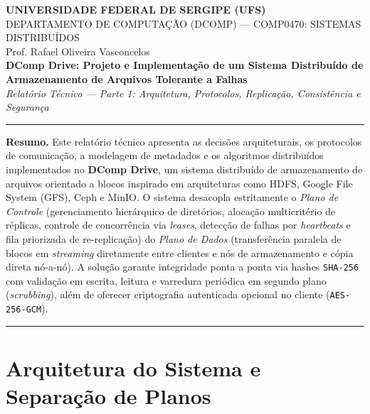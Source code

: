 \documentclass[10pt,a4paper]{article}
\begin{document}
\begin{center}
    {\large\bfseries UNIVERSIDADE FEDERAL DE SERGIPE (UFS)}\\
    {\normalsize DEPARTAMENTO DE COMPUTAÇÃO (DCOMP) — COMP0470: SISTEMAS DISTRIBUÍDOS}\\
    {\small Prof. Rafael Oliveira Vasconcelos}\\[8pt]
    {\LARGE\bfseries\color{ufsblue} DComp Drive: Projeto e Implementação de um Sistema Distribuído de Armazenamento de Arquivos Tolerante a Falhas}\\[4pt]
    {\normalsize\itshape Relatório Técnico — Parte 1: Arquitetura, Protocolos, Replicação, Consistência e Segurança}
\end{center}
\vspace{-4pt}
\noindent\rule{\textwidth}{0.8pt}
\vspace{2pt}

\textbf{Resumo.} Este relatório técnico apresenta as decisões arquiteturais, os protocolos de comunicação, a modelagem de metadados e os algoritmos distribuídos implementados no \textbf{DComp Drive}, um sistema distribuído de armazenamento de arquivos orientado a blocos inspirado em arquiteturas como HDFS, Google File System (GFS), Ceph e MinIO. O sistema desacopla estritamente o \textit{Plano de Controle} (gerenciamento hierárquico de diretórios, alocação multicritério de réplicas, controle de concorrência via \textit{leases}, detecção de falhas por \textit{heartbeats} e fila priorizada de re-replicação) do \textit{Plano de Dados} (transferência paralela de blocos em \textit{streaming} diretamente entre clientes e nós de armazenamento e cópia direta nó-a-nó). A solução garante integridade ponta a ponta via hashes \texttt{SHA-256} com validação em escrita, leitura e varredura periódica em segundo plano (\textit{scrubbing}), além de oferecer criptografia autenticada opcional no cliente (\texttt{AES-256-GCM}).

\noindent\rule{\textwidth}{0.4pt}

\section{Arquitetura do Sistema e Separação de Planos}
\end{document}
